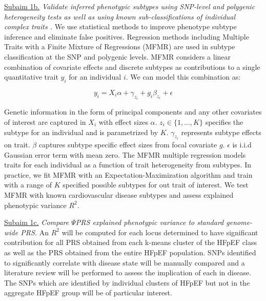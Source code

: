 \documentclass[11pt]{article}  %
\newlength\tindent
\renewcommand{\indent}{\hspace*{\tindent}}
\begin{document}


\indent \underline{Subaim 1b.} \textit{Validate inferred phenotypic subtypes using SNP-level \cite{dahl_reverse_2019} and polygenic heterogeneity tests \cite{dahl_robust_2020} as well as using known sub-classifications of individual complex traits \cite{li_identification_2015} \cite{mordi_differential_2019}.} We use statistical methods to improve phenotype subtype inference and eliminate false positives. Regression methods including Multiple Traits with a Finite Mixture of Regressions (MFMR) \cite{dahl_reverse_2019} are used in subtype classification at the SNP and polygenic levels. MFMR considers a linear combination of covariate effects and discrete subtypes as contributions to a single quantitative trait $y_i$ for an individual $i$. We can model this combination as:

$$
y_i = X_i \alpha + \gamma_{z_i} + g_i \beta_{z_i} + \epsilon
$$

Genetic information in the form of principal components and any other covariates of interest are captured in $X_i$ with effect sizes $\alpha$. $z_i \in \{1,...,K\}$ specifies the subtype for an individual and is parametrized by $K$. $\gamma_{z_i}$ represents subtype effects on trait. $\beta$ captures subtype specific effect sizes from focal covariate $g$. $\epsilon$ is i.i.d Gaussian error term with mean zero. The MFMR multiple regression models traits for each individual as a function of trait heterogeneity from subtypes. In practice, we fit MFMR with an Expectation-Maximization algorithm and train with a range of $K$ specified possible subtypes for out trait of interest. We test MFMR with known cardiovascular disease subtypes \cite{mordi_differential_2019} and assess explained phenotypic variance $R^2$.  


\indent \underline{Subaim 1c.} \textit{Compare $\Psi$PRS explained phenotypic variance to standard genome-wide PRS.} An $R^2$ will be computed for each locus determined to have significant contribution for all PRS obtained from each k-means cluster of the HFpEF class as well as the PRS obtained from the entire HFpEF population. SNPs identified to significantly correlate with disease state will be manually compared and a literature review will be performed to assess the implication of each in disease. The SNPs which are identified by individual clusters of HFpEF but not in the aggregate HFpEF group will be of particular interest.
\end{document}
